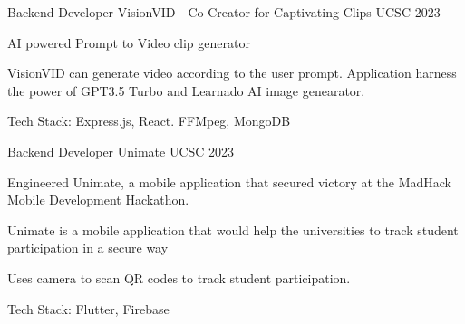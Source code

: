 \begin{cventries}
  \cventry
  {Backend Developer} %
  {VisionVID - Co-Creator for Captivating Clips \href{https://github.com/kulasinghet/visionvid}{\faGithubSquare}} %
  {UCSC} %
  {2023} %
  {
    \begin{cvitems} %
      \item {AI powered Prompt to Video clip generator}
      \item {VisionVID can generate video according to the user prompt. Application harness the power of GPT3.5 Turbo and Learnado AI image genearator. }
      \item {Tech Stack: Express.js, React. FFMpeg, MongoDB}
    \end{cvitems}
  }


  \cventry
  {Backend Developer } %
  {Unimate \href{https://github.com/kulasinghet/unimate}{\faGithubSquare}} %
  {UCSC} %
  {2023} %
  {
    \begin{cvitems} %
      \item {Engineered Unimate, a mobile application that secured victory at the MadHack Mobile Development Hackathon.}
      \item {Unimate is a mobile application that would help the universities to track student participation in a secure way}
      \item {Uses camera to scan QR codes to track student participation.}
      \item {Tech Stack: Flutter, Firebase}
    \end{cvitems}
  }
\end{cventries}
